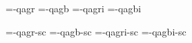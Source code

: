 

\ifx\sizespec\undefined \def\sizespec{}\fi
\ifx\font\corkencoded {}\else {}\fi

\ifx\font\unicoded  {} 
\else

\font\tenrm=\tmp-qagr  \sizespec
\font\tenbf=\tmp-qagb  \sizespec
\font\tenit=\tmp-qagri \sizespec
\font\tenbi=\tmp-qagbi \sizespec

\font\tenrmc=\tmp-qagr-sc  \sizespec
\font\tenbfc=\tmp-qagb-sc  \sizespec
\font\tenitc=\tmp-qagri-sc \sizespec
\font\tenbic=\tmp-qagbi-sc \sizespec

\fi

\tenrm

\def\caps#1{{\escapechar=-1 \expandafter}%
  \expandafter\csname\expandafter\tenonlytext\string#1c\endcsname}
\def\tenonlytext{ten}

\ifx\font\corkencoded \else  \fi

\ifx\normalTXmath\undefined  \else\normalTXmath \fi


